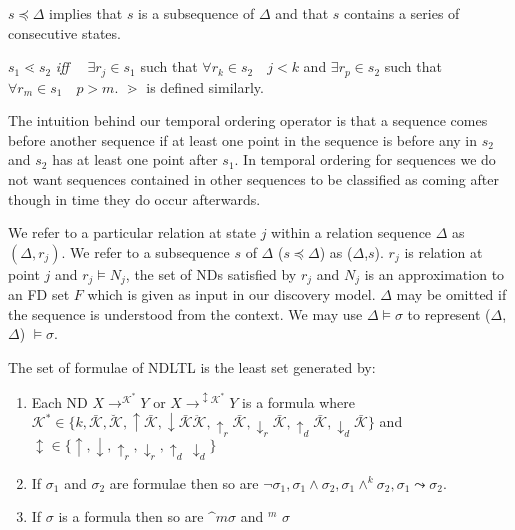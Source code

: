 $s \preceq \Delta$ implies that $s$ is a subsequence of $\Delta$ and
that $s$ contains a series of consecutive states.


\begin{definition}
\begin{rm}
$s_1 \lessdot s_2$ {\em iff} $\quad \exists r_j \in s_1$ such that $\forall r_k
\in s_2 \quad j < k$ and $\exists r_p \in s_2$ such that $\forall r_m
\in s_1 \quad p > m$. $\gtrdot$ is defined similarly.
\end{rm}
\end{definition}

The intuition behind our temporal ordering operator is that a sequence
comes before another sequence if at least one point in the sequence is
before any in $s_2$ and $s_2$ has at least one point after $s_1$. In
temporal ordering for sequences we do not want 
sequences contained in other sequences to be classified as coming
after though in time they do occur afterwards.


We refer to a particular relation at state $j$ within a relation
sequence $\Delta$ as $(\Delta,r_j)$. We refer to a subsequence $s$ of
$\Delta$ ($s \preceq \Delta$) as ($\Delta$,$s$).
$r_j$ is relation at point $j$ and $r_j \models N_j$, the set of
NDs satisfied by $r_j$ and $N_j$ is an approximation to an FD set $F$
which is given as input in our discovery model.  
$\Delta$ may be omitted if the sequence is understood from the context.
We may use $\Delta \models \sigma$ to represent ($\Delta$,$\Delta$)
$\models \sigma$.



The set of formulae of NDLTL is the
least set generated by:
\begin{enumerate}
\item Each ND $X \to^{\mathcal{K}^\ast} Y$ or $X \to^{\updownarrow
\mathcal{K}^\ast} Y$ is a formula where $\mathcal{K}^\ast \in \{ k,
\bar{\mathcal{K}}, \breve{\mathcal{K}}, \uparrow\bar{\mathcal{K}},
\downarrow\bar{\mathcal{K}}
\ddot{\mathcal{K}},\uparrow_r\bar{\mathcal{K}},\downarrow_r\bar{\mathcal{K}},\uparrow_d\bar{\mathcal{K}},\downarrow_d\bar{\mathcal{K}}
\}$  and $\updownarrow  \in \{ \uparrow,
\downarrow, \uparrow_r,\downarrow_r,\uparrow_d\,\downarrow_d \}$
\item If $\sigma_1$ and $\sigma_2$ are formulae then so are $\neg \sigma_1,
\sigma_1 \wedge \sigma_2, \sigma_1 \wedge^k \sigma_2,   \sigma_1 \leadsto
\sigma_2$. 
\item If $\sigma$ is a formula then so are $\bm^m \sigma$ and  \diam$^m$ 
$\sigma$
\end{enumerate}




